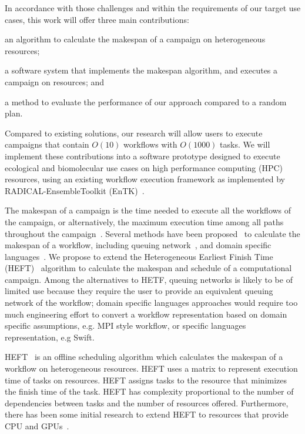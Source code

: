 In accordance with those challenges and within the requirements of our target 
use cases, this work will offer three main contributions: 
\begin{inparaenum}[(1)]
\item an algorithm to calculate the makespan of a campaign on heterogeneous 
resources;
\item a software system that implements the makespan algorithm, and executes a 
campaign on resources; and 
\item a method to evaluate the performance of our approach compared to a random 
plan. 
\end{inparaenum}
Compared to existing solutions, our research will allow users to execute 
campaigns that contain $O(10)$ workflows with $O(1000)$ tasks. We will implement 
these contributions into a software prototype designed to execute ecological 
and biomolecular use cases on high performance computing (HPC) resources, using 
an existing workflow execution framework as implemented by RADICAL-EnsembleToolkit 
(EnTK)~\cite{balasubramanian2018harnessing}.

The makespan of a campaign is the time needed to execute all the workflows of 
the campaign, or alternatively, the maximum execution time among all paths 
throughout the campaign~\cite{chirkin2017execution}. Several methods have been 
proposed~\cite{lu2019review} to calculate the makespan of a workflow, including 
queuing network~\cite{yao2019throughput,bao2019performance}, and domain specific 
languages~\cite{carothers2017durango,maheshwari2016workflow}. We propose to 
extend the Heterogeneous Earliest Finish Time (HEFT)~\cite{topcuoglu2002performance} 
algorithm to calculate the makespan and schedule of a computational campaign. 
Among the alternatives to HETF, queuing networks is likely to be of limited use 
because they require the user to provide an equivalent queuing network of the 
workflow; domain specific languages approaches would require too much engineering 
effort to convert a workflow representation based on domain specific assumptions, 
e.g. MPI style workflow, or specific languages representation, e.g Swift.

HEFT~\cite{topcuoglu2002performance} is an offline scheduling algorithm which 
calculates the makespan of a workflow on heterogeneous resources. HEFT uses a 
matrix to represent execution time of tasks on resources. HEFT assigns tasks to 
the resource that minimizes the finish time of the task. HEFT has complexity 
proportional to the number of dependencies between tasks and the number of 
resources offered. Furthermore, there has been some initial research to extend 
HEFT to resources that provide CPU and GPUs~\cite{shetti2013optimization}. 


